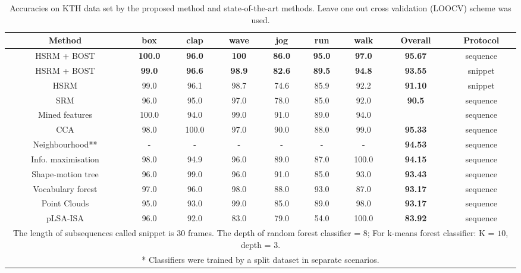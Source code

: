 \begin{sidewaystable}
\centering
\begin{tabular}{|c|c|c|c|c|c|c|c|c|}
\hline
\textbf{Method} & \textbf{box} & \textbf{clap} & \textbf{wave} & \textbf{jog} & \textbf{run} & \textbf{walk} & \textbf{Overall} & \textbf{Protocol} \\
\hline
{HSRM + BOST} & \textbf{ \color{blue} 100.0} & \textbf{ \color{blue}96.0} & \textbf{ \color{blue}100} & \textbf{ \color{blue}86.0} & \textbf{ \color{blue}95.0} & \textbf{ \color{blue}97.0} & \textbf{ \color{blue}95.67} & sequence\\
{HSRM + BOST} & \textbf{ \color{blue} 99.0} & \textbf{ \color{blue} 96.6} & \textbf{ \color{blue}98.9} & \textbf{ \color{blue}82.6} & \textbf{ \color{blue}89.5} & \textbf{ \color{blue}94.8} & \textbf{ \color{blue} 93.55} & snippet\\
HSRM & 99.0 & 96.1 & 98.7 & 74.6 & 85.9 & 92.2 & \textbf{ 91.10} & snippet\\
SRM\cite{Ryoo2009} & 96.0 & 95.0 & 97.0 & 78.0 & 85.0 & 92.0 & \textbf{ 90.5} & sequence\\
\hline
Mined features \cite{Gilbert2009} & 100.0 & 94.0 & 99.0 & 91.0 & 89.0 & 94.0 & \textbf{\color{blue}{96.70}} & sequence\\
CCA \cite{Kim2007} & 98.0 & 100.0 & 97.0 & 90.0 & 88.0 & 99.0 & \textbf{ 95.33} & sequence\\
Neighbourhood** \cite{Kovashka2010} & - & - & - & - & - & - & \textbf{ 94.53} & sequence\\
Info. maximisation \cite{Liu2008} & 98.0 & 94.9 & 96.0 & 89.0 & 87.0 & 100.0 & \textbf{ 94.15} & sequence\\
Shape-motion tree \cite{Lin2009} & 96.0 & 99.0 & 96.0 & 91.0 & 85.0 & 93.0 & \textbf{ 93.43} & sequence\\
Vocabulary forest \cite{Mikolajczyk2008} & 97.0 & 96.0 & 98.0 & 88.0 & 93.0 & 87.0 & \textbf{ 93.17} & sequence\\
Point Clouds \cite{Bregonzio2009} & 95.0 & 93.0 & 99.0 & 85.0 & 89.0 & 98.0 & \textbf{ 93.17} & sequence\\
pLSA-ISA \cite{Wong2007} & 96.0 & 92.0 & 83.0 & 79.0 & 54.0 & 100.0 & \textbf{ 83.92} & sequence\\
\hline
\multicolumn{9}{p{0.9\linewidth}}{
\scriptsize * The length of subsequences called snippet is 30 frames. The depth of random forest classifier = $8$; For k-means forest classifier: K = $10$, depth = $3$. 
}\\
\multicolumn{9}{p{0.9\linewidth}}{
\scriptsize ** Classifiers were trained by a split dataset in separate scenarios. 
}\\
\end{tabular}
\caption{Accuracies on KTH data set by the proposed method and state-of-the-art methods. Leave one out cross validation (LOOCV) scheme was used.}
\label{tab/act/compare}
\end{sidewaystable}
